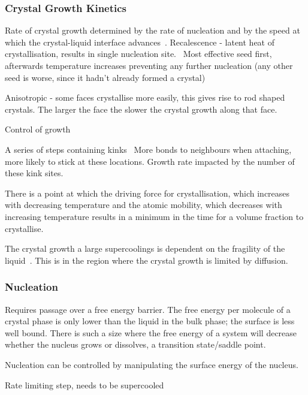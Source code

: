 \subsubsection{Crystal Growth Kinetics}
Rate of crystal growth determined by the rate of nucleation and by the speed at which the crystal-liquid interface advances~\cite{turnbull:69}.
Recalescence - latent heat of crystallisation, results in single nucleation site.~\cite{turnbull:69} Most effective seed first, afterwards temperature increases preventing any further nucleation (any other seed is worse, since it hadn't already formed a crystal)

Anisotropic - some faces crystallise more easily, this gives rise to rod shaped crystals.
The larger the face the slower the crystal growth along that face.

Control of growth~\cite{de-yoreo:03}

A series of steps containing kinks~\cite{chernov:61} More bonds to neighbours when attaching, more likely to stick at these locations. Growth rate impacted by the number of these kink sites.

There is a point at which the driving force for crystallisation, which increases with decreasing temperature and the atomic mobility, which decreases with increasing temperature results in a minimum in the time for a volume fraction to crystallise.~\cite{uhlmann:72}
\begin{figure}
\end{figure}

The crystal growth a large supercoolings is dependent on the fragility of the liquid~\cite{ediger:08}. This is in the region where the crystal growth is limited by diffusion. 


\subsubsection{Nucleation}
Requires passage over a free energy barrier. The free energy per molecule of a crystal phase is only lower than the liquid in the bulk phase; the surface is less well bound. There is such a size where the free energy of a system will decrease whether the nucleus grows or dissolves, a transition state/saddle point.

Nucleation can be controlled by manipulating the surface energy of the nucleus.~\cite{de-yoreo:03}
 
Rate limiting step, needs to be supercooled
 
